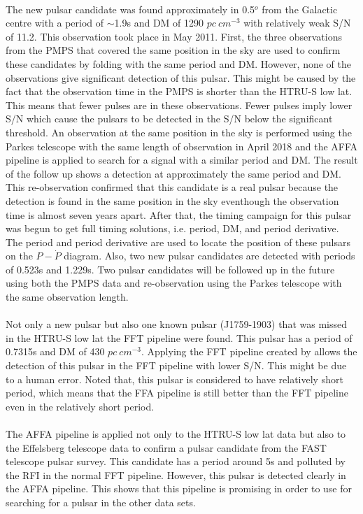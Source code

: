 \documentclass[../chapter1/thesis_msc.tex]{subfiles}
\begin{document}
\paragraph{} The new pulsar candidate was found approximately in 0.5$^o$ from the Galactic centre with a period of $\sim$1.9s and DM of 1290 $pc~cm^{-3}$ with relatively weak S/N of 11.2. This observation took place in May 2011. First, the three observations from the PMPS that covered the same position in the sky are used to confirm these candidates by folding with the same period and DM. However, none of the observations give significant detection of this pulsar. This might be caused by the fact that the observation time in the PMPS is shorter than the HTRU-S low lat. This means that fewer pulses are in these observations. Fewer pulses imply lower S/N which cause the pulsars to be detected in the S/N below the significant threshold.  An observation at the same position in the sky is performed using the Parkes telescope with the same length of observation in April 2018 and the AFFA pipeline is applied to search for a signal with a similar period and DM. The result of the follow up shows a detection at approximately the same period and DM. This re-observation confirmed that this candidate is a real pulsar because the detection is found in the same position in the sky eventhough the observation time is  almost seven years apart. After that, the timing campaign for this pulsar was begun to get full timing solutions, i.e. period, DM, and period derivative. The period and period derivative are used to locate the position of these pulsars on the $P-\dot{P}$ diagram. Also, two new pulsar candidates are detected with periods of 0.523s and 1.229s. Two pulsar candidates will be followed up in the future using both the PMPS data and re-observation using the Parkes telescope with the same observation length.
\paragraph{} Not only a new pulsar but also one known pulsar (J1759-1903) that was missed in the HTRU-S low lat the FFT pipeline were found. This pulsar has a period of 0.7315s and DM of 430 $pc~cm^{-3}$. Applying the FFT pipeline created by \cite{Ng} allows the detection of this pulsar in the FFT pipeline with lower S/N. This might be due to a human error. Noted that, this pulsar is considered to have relatively short period, which means that the FFA pipeline is still better than the FFT pipeline even in the relatively short period.
\paragraph{} The AFFA pipeline is applied not only to the HTRU-S low lat data but also to the Effelsberg telescope data to confirm a pulsar candidate from the FAST telescope pulsar survey. This candidate has a period around 5s and polluted by the RFI in the normal FFT pipeline. However, this pulsar is detected clearly in the AFFA pipeline. This shows that this pipeline is promising in order to use for searching for a pulsar in the other data sets.
\end{document}
